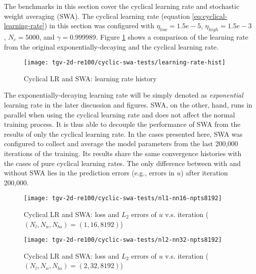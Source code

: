 The benchmarks in this section cover the cyclical learning rate and stochastic weight averaging (SWA).
The cyclical learning rate (equation \eqref{eq:cyclical-learning-rate}) in this section was configured with $\eta_{low}=1.5e-5$, $\eta_{high}=1.5e-3$, $N_c=5000$, and $\gamma=0.999989$.
Figure \ref{fig:cyclic-swa-tests-lr-hist} shows a comparison of the learning rate from the original exponentially-decaying and the cyclical learning rate.
\begin{figure}[hbt!]
    \centering%
    \texttt{[image: tgv-2d-re100/cyclic-swa-tests/learning-rate-hist]}%
    \caption[%
        Cyclical LR and SWA: learning rate history%
    ]{%
        Cyclical LR and SWA: learning rate history%
    }\label{fig:cyclic-swa-tests-lr-hist}%
\end{figure}
The exponentially-decaying learning rate will be simply denoted as {\it exponential} learning rate in the later discussion and figures.
SWA, on the other, hand, runs in parallel when using the cyclical learning rate and does not affect the normal training process.
It is thus able to decouple the performance of SWA from the results of only the cyclical learning rate.
In the cases presented here, SWA was configured to collect and average the model parameters from the last 200,000 iterations of the training.
Its results share the same convergence histories with the cases of pure cyclical learning rates.
The only difference between with and without SWA lies in the prediction errors (e.g., errors in $u$) after iteration 200,000.

\begin{figure}[hbt!]
    \centering%
    \texttt{[image: tgv-2d-re100/cyclic-swa-tests/nl1-nn16-npts8192]}%
    \caption[%
        Cyclical LR and SWA: loss and $L_2$ errors of $u$ v.s. iteration ($(N_l, N_n, N_{bs})=(1, 16, 8192)$)%
    ]{%
        Cyclical LR and SWA: loss and $L_2$ errors of $u$ v.s. iteration ($(N_l, N_n, N_{bs})=(1, 16, 8192)$)%
    }\label{fig:cyclic-swa-tests-nl1-nn16-npts8192}%
\end{figure}

\begin{figure}[hbt!]
    \centering%
    \texttt{[image: tgv-2d-re100/cyclic-swa-tests/nl2-nn32-npts8192]}%
    \caption[%
        Cyclical LR and SWA: loss and $L_2$ errors of $u$ v.s. iteration ($(N_l, N_n, N_{bs})=(2, 32, 8192)$)%
    ]{%
        Cyclical LR and SWA: loss and $L_2$ errors of $u$ v.s. iteration ($(N_l, N_n, N_{bs})=(2, 32, 8192)$)%
    }\label{fig:cyclic-swa-tests-nl2-nn32-npts8192}%
\end{figure}

